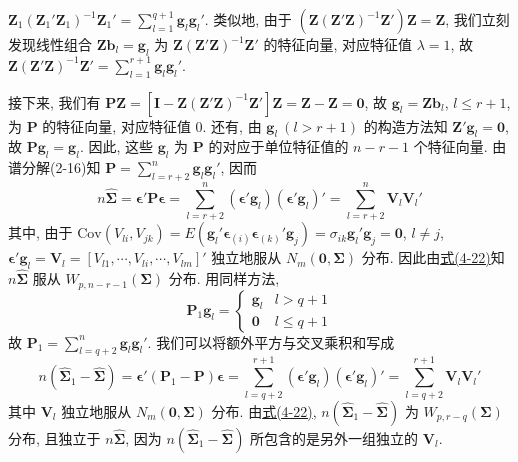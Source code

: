 
$\mathbf{Z}_1(\mathbf{Z}_1'\mathbf{Z}_1)^{-1}\mathbf{Z}_1'=\sum_{l=1}^{q+1}\mathbf{g}_l\mathbf{g}_l'$. 类似地, 由于 $(\mathbf{Z}(\mathbf{Z}'\mathbf{Z})^{-1}\mathbf{Z}')\mathbf{Z}=\mathbf{Z}$, 我们立刻发现线性组合 $\mathbf{Z}\mathbf{b}_l=\mathbf{g}_l$ 为 $\mathbf{Z}(\mathbf{Z}'\mathbf{Z})^{-1}\mathbf{Z}'$ 的特征向量, 对应特征值 $\lambda=1$, 故 $\mathbf{Z}(\mathbf{Z}'\mathbf{Z})^{-1}\mathbf{Z}'=\sum_{l=1}^{r+1}\mathbf{g}_l\mathbf{g}_l'$.

接下来, 我们有 $\mathbf{P}\mathbf{Z}=[\mathbf{I}-\mathbf{Z}(\mathbf{Z}'\mathbf{Z})^{-1}\mathbf{Z}']\mathbf{Z}=\mathbf{Z}-\mathbf{Z}=\mathbf{0}$, 故 $\mathbf{g}_l=\mathbf{Z}\mathbf{b}_l$, $l\leqslant r+1$, 为 $\mathbf{P}$ 的特征向量, 对应特征值 0. 还有, 由 $\mathbf{g}_l\ (l>r+1)$ 的构造方法知 $\mathbf{Z}'\mathbf{g}_l=\mathbf{0}$, 故 $\mathbf{P}\mathbf{g}_l=\mathbf{g}_l$. 因此, 这些 $\mathbf{g}_l$ 为 $\mathbf{P}$ 的对应于单位特征值的 $n-r-1$ 个特征向量. 由谱分解(2-16)知 $\mathbf{P}=\sum_{l=r+2}^{n}\mathbf{g}_l\mathbf{g}_l'$, 因而
\[
n\hat{\boldsymbol{\Sigma}}=\boldsymbol{\epsilon}'\mathbf{P}\boldsymbol{\epsilon}
=\sum_{l=r+2}^{n}(\boldsymbol{\epsilon}'\mathbf{g}_l)(\boldsymbol{\epsilon}'\mathbf{g}_l)'
=\sum_{l=r+2}^{n}\mathbf{V}_l\mathbf{V}_l'
\]
其中, 由于 $\mathrm{Cov}(V_{li},V_{jk})=E(\mathbf{g}_l'\boldsymbol{\epsilon}_{(i)}\boldsymbol{\epsilon}_{(k)}'\mathbf{g}_j)=\sigma_{ik}\mathbf{g}_l'\mathbf{g}_j=\mathbf{0}$, $l\neq j$, $\boldsymbol{\epsilon}'\mathbf{g}_l=\mathbf{V}_l=[V_{l1},\cdots,V_{li},\cdots,V_{lm}]'$ 独立地服从 $N_m(\mathbf{0},\boldsymbol{\Sigma})$ 分布. 因此由\hyperref[eq:4-22]{式(4-22)}知 $n\hat{\boldsymbol{\Sigma}}$ 服从 $W_{p,n-r-1}(\boldsymbol{\Sigma})$ 分布. 用同样方法,
\[
\mathbf{P}_1\mathbf{g}_l=\begin{cases}
\mathbf{g}_l & l>q+1\\
\mathbf{0} & l\leqslant q+1
\end{cases}
\]
故 $\mathbf{P}_1=\sum_{l=q+2}^{n}\mathbf{g}_l\mathbf{g}_l'$. 我们可以将额外平方与交叉乘积和写成
\[
n(\hat{\boldsymbol{\Sigma}}_1-\hat{\boldsymbol{\Sigma}})=\boldsymbol{\epsilon}'(\mathbf{P}_1-\mathbf{P})\boldsymbol{\epsilon}
=\sum_{l=q+2}^{r+1}(\boldsymbol{\epsilon}'\mathbf{g}_l)(\boldsymbol{\epsilon}'\mathbf{g}_l)'
=\sum_{l=q+2}^{r+1}\mathbf{V}_l\mathbf{V}_l'
\]
其中 $\mathbf{V}_l$ 独立地服从 $N_m(\mathbf{0},\boldsymbol{\Sigma})$ 分布. 由\hyperref[eq:4-22]{式(4-22)}, $n(\hat{\boldsymbol{\Sigma}}_1-\hat{\boldsymbol{\Sigma}})$ 为 $W_{p,r-q}(\boldsymbol{\Sigma})$ 分布, 且独立于 $n\hat{\boldsymbol{\Sigma}}$, 因为 $n(\hat{\boldsymbol{\Sigma}}_1-\hat{\boldsymbol{\Sigma}})$ 所包含的是另外一组独立的 $\mathbf{V}_l$.

